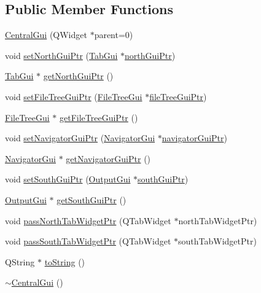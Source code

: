 \subsection*{Public Member Functions}
\begin{DoxyCompactItemize}
\item 
\hyperlink{class_central_gui_aba31873e4b5d4bf9fd1e563601efc4e7}{Central\-Gui} (Q\-Widget $\ast$parent=0)
\item 
void \hyperlink{class_central_gui_a4c4fb762977d1295b564b36537299ed7}{set\-North\-Gui\-Ptr} (\hyperlink{class_tab_gui}{Tab\-Gui} $\ast$\hyperlink{class_central_gui_a9b03db6d32ac3138fde0213d41bea0af}{north\-Gui\-Ptr})
\item 
\hyperlink{class_tab_gui}{Tab\-Gui} $\ast$ \hyperlink{class_central_gui_aeb363fd8e3880fa97b52eaf6d905e1d4}{get\-North\-Gui\-Ptr} ()
\item 
void \hyperlink{class_central_gui_a65abd3c9dc8bb14a60ca89da399c427e}{set\-File\-Tree\-Gui\-Ptr} (\hyperlink{class_file_tree_gui}{File\-Tree\-Gui} $\ast$\hyperlink{class_central_gui_a6abfae93daa17e3af2a814888c9c14cf}{file\-Tree\-Gui\-Ptr})
\item 
\hyperlink{class_file_tree_gui}{File\-Tree\-Gui} $\ast$ \hyperlink{class_central_gui_aba7129fa7a935565409beb63498c2eb3}{get\-File\-Tree\-Gui\-Ptr} ()
\item 
void \hyperlink{class_central_gui_ab8375fbf4f11a785d1bdf35c6678f7fd}{set\-Navigator\-Gui\-Ptr} (\hyperlink{class_navigator_gui}{Navigator\-Gui} $\ast$\hyperlink{class_central_gui_a902df8268cd1e83d1991ea88eafb9220}{navigator\-Gui\-Ptr})
\item 
\hyperlink{class_navigator_gui}{Navigator\-Gui} $\ast$ \hyperlink{class_central_gui_a700dcc17aa9827601879655206117fef}{get\-Navigator\-Gui\-Ptr} ()
\item 
void \hyperlink{class_central_gui_af407a4ca044dccbdb7363ed9d200ab1c}{set\-South\-Gui\-Ptr} (\hyperlink{class_output_gui}{Output\-Gui} $\ast$\hyperlink{class_central_gui_ae7012a7f0abe1fea596ce6af795c1741}{south\-Gui\-Ptr})
\item 
\hyperlink{class_output_gui}{Output\-Gui} $\ast$ \hyperlink{class_central_gui_a210462a5153619fbf617f999c4e54e4c}{get\-South\-Gui\-Ptr} ()
\item 
void \hyperlink{class_central_gui_a072a884564050875f6d8be502976e2a6}{pass\-North\-Tab\-Widget\-Ptr} (Q\-Tab\-Widget $\ast$north\-Tab\-Widget\-Ptr)
\item 
void \hyperlink{class_central_gui_a9f2e7b269810e32cb32ad0fb83b046a6}{pass\-South\-Tab\-Widget\-Ptr} (Q\-Tab\-Widget $\ast$south\-Tab\-Widget\-Ptr)
\item 
Q\-String $\ast$ \hyperlink{class_central_gui_ae7472cc4fa658e7ce26e22c5070bd443}{to\-String} ()
\item 
\hyperlink{class_central_gui_ad54c2077e29d7a2017399b39e62c1043}{$\sim$\-Central\-Gui} ()
\end{DoxyCompactItemize}
